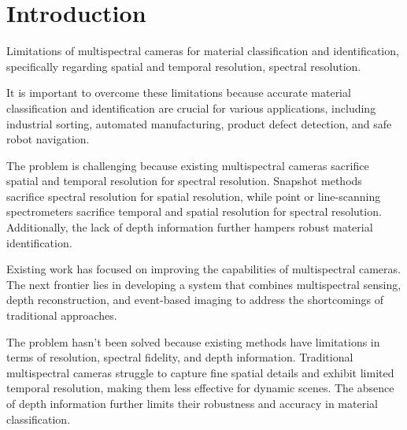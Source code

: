 \section{Introduction}
\label{sec:intro}


Limitations of multispectral cameras for material classification and identification, specifically regarding spatial and temporal resolution, spectral resolution.

It is important to overcome these limitations because accurate material classification and identification are crucial for various applications, including industrial sorting, automated manufacturing, product defect detection, and safe robot navigation.

The problem is challenging because existing multispectral cameras sacrifice spatial and temporal resolution for spectral resolution. 
Snapshot methods sacrifice spectral resolution for spatial resolution, while point or line-scanning spectrometers sacrifice temporal and spatial resolution for spectral resolution. 
Additionally, the lack of depth information further hampers robust material identification.

Existing work has focused on improving the capabilities of multispectral cameras. 
The next frontier lies in developing a system that combines multispectral sensing, depth reconstruction, and event-based imaging to address the shortcomings of traditional approaches.

The problem hasn't been solved because existing methods have limitations in terms of resolution, spectral fidelity, and depth information. 
Traditional multispectral cameras struggle to capture fine spatial details and exhibit limited temporal resolution, making them less effective for dynamic scenes. 
The absence of depth information further limits their robustness and accuracy in material classification.


